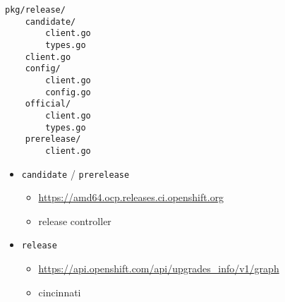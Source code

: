 \begin{frame}[fragile]
    \autotitle
    \begin{verbatim}
pkg/release/
    candidate/
        client.go
        types.go
    client.go
    config/
        client.go
        config.go
    official/
        client.go
        types.go
    prerelease/
        client.go
    \end{verbatim}
\end{frame}

\begin{frame}
    \autotitle
    \begin{itemize}
        \item \texttt{candidate} / \texttt{prerelease}
            \begin{itemize}
                \item \url{https://amd64.ocp.releases.ci.openshift.org}
                \item release controller
            \end{itemize}
        \item \texttt{release}
            \begin{itemize}
                \item {\footnotesize\url{https://api.openshift.com/api/upgrades_info/v1/graph}}
                \item cincinnati
            \end{itemize}
    \end{itemize}
\end{frame}

